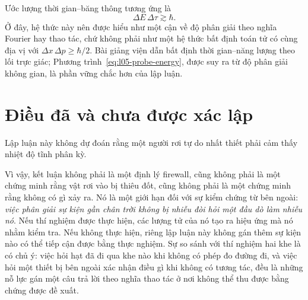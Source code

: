 Ước lượng thời gian–băng thông tương ứng là
\begin{equation}
\Delta E\,\Delta\tau\gtrsim\hbar.
\end{equation}
Ở đây, hệ thức này nên được hiểu như một cận về độ phân giải theo nghĩa Fourier hay thao tác, chứ không phải như một hệ thức bất định toán tử có cùng địa vị với \(\Delta x\,\Delta p\geq\hbar/2\). Bài giảng viện dẫn bất định thời gian–năng lượng theo lối trực giác; Phương trình~\eqref{eq:l05-probe-energy}, được suy ra từ độ phân giải không gian, là phần vững chắc hơn của lập luận.

\begin{classroomqa}
\end{classroomqa}

\enlargethispage{2\baselineskip}
\section{Điều đã và chưa được xác lập}

Lập luận này không dự đoán rằng một người rơi tự do nhất thiết phải cảm thấy nhiệt độ tĩnh phân kỳ.

\begin{classroomqa}
\end{classroomqa}

Vì vậy, kết luận không phải là một định lý firewall, cũng không phải là một chứng minh rằng vật rơi vào bị thiêu đốt, cũng không phải là một chứng minh rằng không có gì xảy ra. Nó là một giới hạn đối với sự kiểm chứng từ bên ngoài: \emph{việc phân giải sự kiện gần chân trời không bị nhiễu đòi hỏi một đầu dò làm nhiễu nó}.
Nếu thí nghiệm được thực hiện, các lượng tử của nó tạo ra hiệu ứng mà nó nhằm kiểm tra. Nếu không thực hiện, riêng lập luận này không gán thêm sự kiện nào có thể tiếp cận được bằng thực nghiệm. Sự so sánh với thí nghiệm hai khe là có chủ ý: việc hỏi hạt đã đi qua khe nào khi không có phép đo đường đi, và việc hỏi một thiết bị bên ngoài xác nhận điều gì khi không có tương tác, đều là những nỗ lực gán một câu trả lời theo nghĩa thao tác ở nơi không thể thu được bằng chứng được đề xuất.
